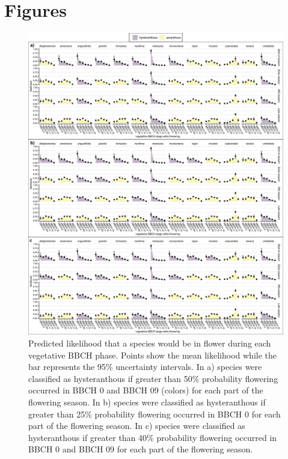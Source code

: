 \documentclass{article}[11pt]
\begin{document}
\section*{Figures} 
\begin{figure}[h!]
    \centering
 \includegraphics[width=.95\textwidth]{..//..//Plots/ord_quants_phylo.jpeg}
    \caption{Predicted likelihood that a species would be in flower during each vegetative BBCH phase. Points show the mean likelihood while the bar represents the 95\% uncertainty intervals. In a) species were classified as hysteranthous if greater than 50\% probability flowering occurred in BBCH 0 and BBCH 09 (colors) for each part of the flowering season. In b) species were classified as hysteranthous if greater than 25\% probability flowering occurred in BBCH 0 for each part of the flowering season. In c) species were classified as hysteranthous if greater than 40\% probability flowering occurred in BBCH 0 and BBCH 09 for each part of the flowering season.}
    \label{fig:plums}
\end{figure}
\end{document}

